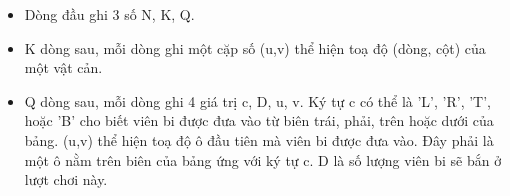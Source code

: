 \begin{itemize}
	\item     Dòng đầu ghi 3 số N, K, Q.   
	\item     K dòng sau, mỗi dòng ghi một cặp số (u,v) thể hiện toạ độ (dòng, cột) của một vật cản.   
	\item     Q dòng sau, mỗi dòng ghi 4 giá trị c, D, u, v. Ký tự c có thể là 'L', 'R', 'T', hoặc 'B' cho biết viên bi được đưa vào từ biên trái, phải, trên hoặc dưới của bảng. (u,v) thể hiện toạ độ ô đầu tiên mà viên bi được đưa vào. Đây phải là một ô nằm trên biên của bảng ứng với ký tự c. D là số lượng viên bi sẽ bắn ở lượt chơi này.   
\end{itemize}